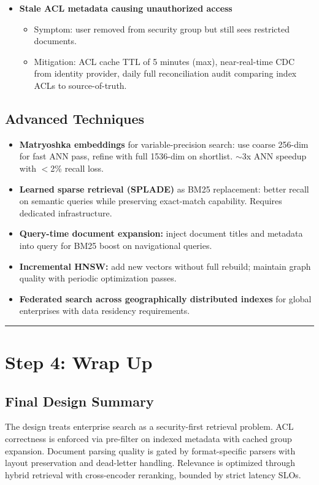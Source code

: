 \begin{itemize}
  \item \textbf{Stale ACL metadata causing unauthorized access}
  \begin{itemize}
    \item Symptom: user removed from security group but still sees restricted documents.
    \item Mitigation: ACL cache TTL of 5 minutes (max), near-real-time CDC from identity provider, daily full reconciliation audit comparing index ACLs to source-of-truth.
  \end{itemize}
\end{itemize}

\subsection*{Advanced Techniques}

\begin{itemize}
  \item \textbf{Matryoshka embeddings} for variable-precision search: use coarse 256-dim for fast ANN pass, refine with full 1536-dim on shortlist. $\sim$3x ANN speedup with $<$2\% recall loss.
  \item \textbf{Learned sparse retrieval (SPLADE)} as BM25 replacement: better recall on semantic queries while preserving exact-match capability. Requires dedicated infrastructure.
  \item \textbf{Query-time document expansion:} inject document titles and metadata into query for BM25 boost on navigational queries.
  \item \textbf{Incremental HNSW:} add new vectors without full rebuild; maintain graph quality with periodic optimization passes.
  \item \textbf{Federated search across geographically distributed indexes} for global enterprises with data residency requirements.
\end{itemize}

\bigskip\hrule\bigskip

\section*{Step 4: Wrap Up}

\subsection*{Final Design Summary}

The design treats enterprise search as a security-first retrieval problem. ACL correctness is enforced via pre-filter on indexed metadata with cached group expansion. Document parsing quality is gated by format-specific parsers with layout preservation and dead-letter handling. Relevance is optimized through hybrid retrieval with cross-encoder reranking, bounded by strict latency SLOs.

